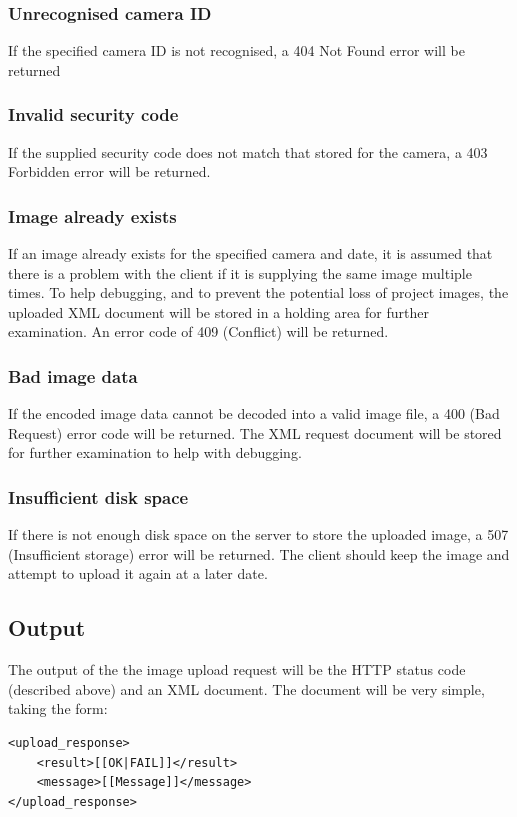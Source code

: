 \documentclass[11pt]{article}
\begin{document}
\subsubsection{Unrecognised camera ID}
If the specified camera ID is not recognised, a 404 Not Found error will be returned

\subsubsection{Invalid security code}
If the supplied security code does not match that stored for the camera, a 403 Forbidden error will be returned.

\subsubsection{Image already exists}
If an image already exists for the specified camera and date, it is assumed that there is a problem with the client if it is supplying the same image multiple times. To help debugging, and to prevent the potential loss of project images, the uploaded XML document will be stored in a holding area for further examination. An error code of 409 (Conflict) will be returned.

\subsubsection{Bad image data}
If the encoded image data cannot be decoded into a valid image file, a 400 (Bad Request) error code will be returned. The XML request document will be stored for further examination to help with debugging.

\subsubsection{Insufficient disk space}
If there is not enough disk space on the server to store the uploaded image, a 507 (Insufficient storage) error will be returned. The client should keep the image and attempt to upload it again at a later date.

\subsection{Output}
The output of the the image upload request will be the HTTP status code (described above) and an XML document. The document will be very simple, taking the form:

\begin{verbatim}
<upload_response>
    <result>[[OK|FAIL]]</result>
    <message>[[Message]]</message>
</upload_response>
\end{verbatim}
\end{document}
